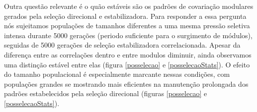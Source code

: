 Outra questão relevante é o quão estáveis são os padrões de covariação
modulares gerados pela seleção direcional e estabilizadora. 
Para responder a essa pergunta nós sujeitamos populações de tamanhos
diferentes a uma mesma pressão seletiva intensa durante 5000 gerações
(periodo suficiente para o surgimento de módulos), seguidas de 5000
gerações de seleção estabilizadora correlacionada. 
Apesar da diferença entre as correlações dentro e entre modulos
diminuir, ainda observamos uma distinção estável entre elas (figura
\ref{posselecao} e \ref{posselecaoStats}). 
O efeito do tamanho populacional é especialmente marcante nessas
condições, com populações grandes se mostrando mais eficientes na
manutenção prolongada dos padrões estabelecidos pela seleção direcional
(figuras \ref{posselecao} e \ref{posselecaoStats}). 

\begin{center}
\begin{figure}[htbp]
  \centering
  \vspace{11pt}
  \\
  \vspace{-18pt}
  \vspace{11pt}

\end{figure}
\end{center}
